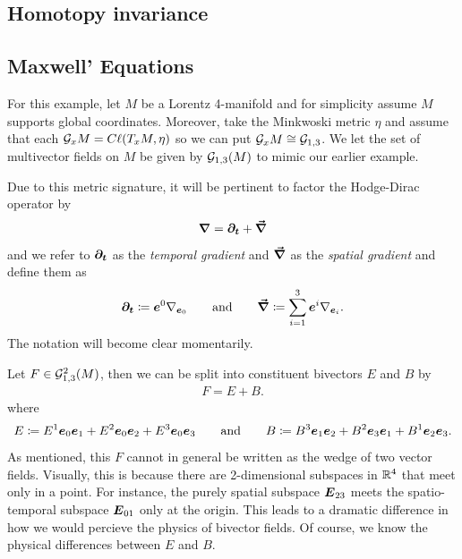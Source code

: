 \documentclass{article}
\begin{document}
\subsection{Homotopy invariance}


\subsection{Maxwell' Equations}


For this example, let $M$ be a Lorentz 4-manifold and for simplicity assume $M$ supports global coordinates. Moreover, take the Minkwoski metric $\eta$ and assume that each $\mathcal{G}_xM = C\ell(T_xM,\eta)$ so we can put $\mathcal{G}_xM\cong \mathcal{G}_{1,3}$. We let the set of multivector fields on $M$ be given by $\mathcal{G}_{1,3}(M)$ to mimic our earlier example. 

Due to this metric signature, it will be pertinent to factor the Hodge-Dirac operator by
\begin{equation}
    \boldsymbol{\nabla} = \boldsymbol{\partial_t} + \boldsymbol{\vec{\nabla}}
\end{equation}
and we refer to $\boldsymbol{\partial_t}$ as the \emph{temporal gradient} and $\boldsymbol{\vec{\nabla}}$ as the \emph{spatial gradient} and define them as
\begin{align}
    \boldsymbol{\partial_t} \coloneqq \boldsymbol{e}^0 \nabla_{\boldsymbol{e}_0} \qquad \textrm{and} \qquad \boldsymbol{\vec{\nabla}} \coloneqq \sum_{i=1}^3 \boldsymbol{e}^i \nabla_{\boldsymbol{e}_i}.
\end{align}
The notation will become clear momentarily. 

Let $F\in \mathcal{G}^2_{1,3}(M)$, then we can be split into constituent bivectors $E$ and $B$ by
\begin{align}
	F = E+B.
\end{align}
where
\begin{equation}
    E \coloneqq E^1 \boldsymbol{e}_0 \boldsymbol{e}_1 + E^2 \boldsymbol{e}_0 \boldsymbol{e}_2 + E^3 \boldsymbol{e}_0 \boldsymbol{e}_3 \qquad \textrm{and} \qquad B \coloneqq B^{3} \boldsymbol{e}_1 \boldsymbol{e}_2 + B^{2} \boldsymbol{e}_3 \boldsymbol{e}_1 + B^{1} \boldsymbol{e}_2 \boldsymbol{e}_3.
\end{equation}
As mentioned, this $F$ cannot in general be written as the wedge of two vector fields. Visually, this is because there are 2-dimensional subspaces in $\mathbb{R}^4$ that meet only in a point. For instance, the purely spatial subspace $\boldsymbol{E}_{23}$ meets the spatio-temporal subspace $\boldsymbol{E}_{01}$ only at the origin. This leads to a dramatic difference in how we would percieve the physics of bivector fields. Of course, we know the physical differences between $E$ and $B$.
\end{document}
